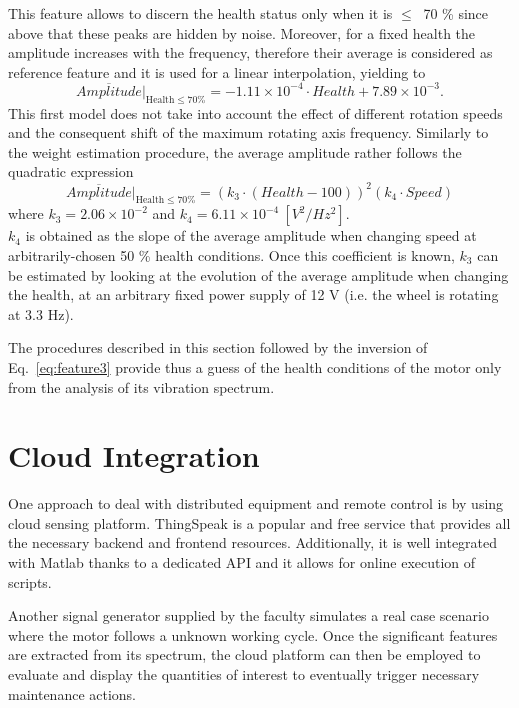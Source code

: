 \documentclass[12pt]{article}
\begin{document}
	This feature allows to discern the health status only when it is $\leq\ $ 70 \% since above that these peaks are hidden by noise. Moreover, for a fixed health the amplitude increases with the frequency, therefore their average is considered as reference feature and it is used for a linear interpolation, yielding to
	\begin{equation}
	\overline{Amplitude}\bigr|_{\text{Health}\leq 70 \%} = -1.11\times10^{-4}\cdot Health + 7.89\times 10^{-3}.
	\end{equation}
	This first model does not take into account the effect of different rotation speeds and the consequent shift of the maximum rotating axis frequency. Similarly to the weight estimation procedure, the average amplitude rather follows the quadratic expression
	\begin{equation}\label{eq:feature3}
	\overline{Amplitude}\bigr|_{\text{Health}\leq 70 \%} = \left( k_3\cdot\left( Health - 100\right) \right)^2\left( k_4\cdot Speed\right) 
	\end{equation}
	where $k_3= 2.06\times10^{-2}$ and $k_4 = 6.11\times 10^{-4}\ [V^2/Hz^2]$.\\
	$k_4$ is obtained as the slope of the average amplitude when changing speed at arbitrarily-chosen 50 \% health conditions. Once this coefficient is known, $k_3$ can be estimated by looking at the evolution of the average amplitude when changing the health, at an arbitrary fixed power supply of 12 V (i.e. the wheel is rotating at 3.3 Hz).
	
	The procedures described in this section followed by the inversion of Eq.~\eqref{eq:feature3} provide thus a guess of the health conditions of the motor only from the analysis of its vibration spectrum.
\section{Cloud Integration}
One approach to deal with distributed equipment and remote control is by using cloud sensing platform. ThingSpeak \cite{TS} is a popular and free service that provides all the necessary backend and frontend resources. Additionally, it is well integrated with Matlab thanks to a dedicated API and it allows for online execution of scripts.

Another signal generator supplied by the faculty simulates a real case scenario where the motor follows a unknown working cycle. Once the significant features are extracted from its spectrum, the cloud platform can then be employed to evaluate and display the quantities of interest to eventually trigger necessary maintenance actions. 
\end{document}
